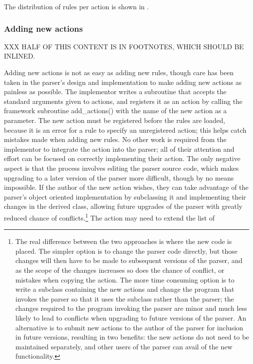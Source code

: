 The distribution of rules per action is shown in .


\subsubsection{Adding new actions}

\label{adding new actions}

XXX HALF OF THIS CONTENT IS IN FOOTNOTES, WHICH SHOULD BE INLINED\@.

Adding new actions is not as easy as adding new rules, though care has been
taken in the parser's design and implementation to make adding new actions
as painless as possible.  The implementor writes a subroutine that accepts
the standard arguments given to actions, and registers it as an action by
calling the framework subroutine add\_actions() with the name of the new
action as a parameter.  The new action must be registered before the rules
are loaded, because it is an error for a rule to specify an unregistered
action; this helps catch mistakes made when adding new rules.  No other
work is required from the implementor to integrate the action into the
parser; all of their attention and effort can be focused on correctly
implementing their action.  The only negative aspect is that the process
involves editing the parser source code, which makes upgrading to a later
version of the parser more difficult, though by no means impossible.  If
the author of the new action wishes, they can take advantage of the
parser's object oriented implementation by subclassing it and implementing
their changes in the derived class, allowing future upgrades of the parser
with greatly reduced chance of conflicts.\footnote{The real difference
between the two approaches is where the new code is placed.  The simpler
option is to change the parser code directly, but those changes will then
have to be made to subsequent versions of the parser, and as the scope of
the changes increases so does the chance of conflict, or mistakes when
copying the action.  The more time consuming option is to write a subclass
containing the new actions and change the program that invokes the parser
so that it uses the subclass rather than the parser; the changes required
to the program invoking the parser are minor and much less likely to lead
to conflicts when upgrading to future versions of the parser.  An
alternative is to submit new actions to the author of the parser for
inclusion in future versions, resulting in two benefits: the new actions do
not need to be maintained separately, and other users of the parser can
avail of the new functionality.} The action may need to extend the list of
